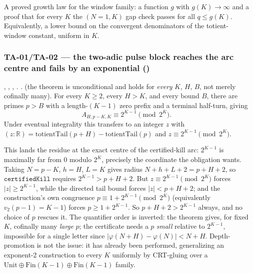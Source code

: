 \begin{prop}
A proved growth law for the window family: a function $g$ with $g(K)\to\infty$ and a proof that for
every $K$ the $(N{=}1,K)$ gap check passes for all $q\le g(K)$. Equivalently, a lower bound on the
convergent denominators of the totient-window constant, uniform in $K$.
\end{prop}

\subsubsection{TA-01/TA-02 --- the two-adic pulse block reaches the arc centre and fails by an exponential ()}

\begin{thm}
,
,
,
.
.  (the theorem is unconditional and holds for \emph{every} $K$, $H$, $B$,
not merely cofinally many). For every $K\ge 2$, every $H>K$, and every bound $B$, there are primes
$p>B$ with a length-$(K{-}1)$ zero prefix and a terminal half-turn, giving
\[
  A_{H,p-K,K} \equiv 2^{K-1} \pmod{2^K}.
\]
Under eventual integrality this transfers to an integer $z$ with $(z:\mathbb R) =
\mathrm{totientTail}(p{+}H) - \mathrm{totientTail}(p)$ and $z\equiv 2^{K-1}\pmod{2^K}$.
\end{thm}

\begin{rem}
This lands the residue at the exact centre of the certified-kill arc: $2^{K-1}$ is maximally far
from $0$ modulo $2^K$, precisely the coordinate the obligation wants. Taking $N{=}p{-}K$,
$h{=}H$, $L{=}K$ gives radius $N{+}h{+}L{+}2 = p{+}H{+}2$, so $\mathtt{certifiedKill}$ requires
$2^{K-1} > p{+}H{+}2$. But $z\equiv 2^{K-1}\pmod{2^K}$ forces $|z|\ge 2^{K-1}$, while the directed
tail bound forces $|z| < p{+}H{+}2$; and the construction's own congruence
$p\equiv 1{+}2^{K-1}\pmod{2^K}$ (equivalently $v_2(p{-}1)=K{-}1$) forces $p\ge 1{+}2^{K-1}$. So
$p{+}H{+}2 > 2^{K-1}$ always, and no choice of $p$ rescues it. The quantifier order is inverted:
the theorem gives, for fixed $K$, cofinally many \emph{large} $p$; the certificate needs a $p$
\emph{small} relative to $2^{K-1}$, impossible for a single letter since $|\varphi(N{+}H)-\varphi(N)|
< N{+}H$. Depth-promotion is not the issue: it has already been performed, generalizing an
exponent-2 construction to every $K$ uniformly by CRT-gluing over a
$\mathrm{Unit}\oplus\mathrm{Fin}(K{-}1)\oplus\mathrm{Fin}(K{-}1)$ family.
\end{rem}

